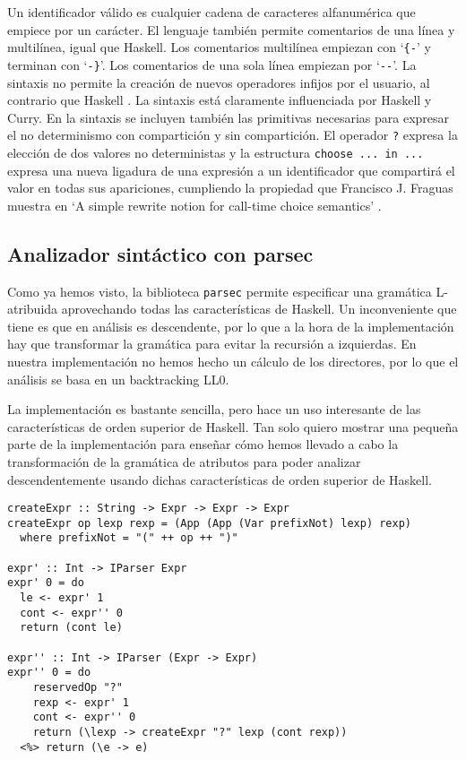 \documentclass[class=article, crop=false]{standalone}
\begin{document}
Un identificador válido es cualquier cadena de caracteres alfanumérica que empiece por un
carácter. El lenguaje también permite comentarios de una línea y multilínea, igual que
Haskell. Los comentarios multilínea empiezan con `\verb`{-`' y terminan con `\verb`-}`'. Los
comentarios de una sola línea empiezan por `\verb`--`'. La sintaxis no permite la creación de
nuevos operadores infijos por el usuario, al contrario que Haskell \cite{marlow2010haskell}.
La sintaxis está claramente influenciada por Haskell y Curry. En la sintaxis se incluyen
también las primitivas necesarias para expresar el no determinismo con compartición y sin
compartición. El operador \verb`?` expresa la elección de dos valores no deterministas y la
estructura \verb`choose ... in ...` expresa una nueva ligadura de una expresión a un
identificador que compartirá el valor en todas sus apariciones, cumpliendo la propiedad que
Francisco J. Fraguas muestra en `A simple rewrite notion for call-time choice semantics'
\cite{lopez2007simple}.

\subsection{Analizador sintáctico con parsec}\label{sec:analizador_sintactico}

Como ya hemos visto, la biblioteca \verb`parsec` permite especificar una gramática
L-atribuida aprovechando todas las características de Haskell. Un inconveniente que tiene es
que en análisis es descendente, por lo que a la hora de la implementación hay que transformar
la gramática para evitar la recursión a izquierdas. En nuestra implementación no hemos hecho
un cálculo de los directores, por lo que el análisis se basa en un backtracking LL0.

La implementación es bastante sencilla, pero hace un uso interesante de las características
de orden superior de Haskell. Tan solo quiero mostrar una pequeña parte de la
implementación para enseñar cómo hemos llevado a cabo la transformación de la gramática de
atributos para poder analizar descendentemente usando dichas características de orden
superior de Haskell.

\begin{verbatim}
createExpr :: String -> Expr -> Expr -> Expr
createExpr op lexp rexp = (App (App (Var prefixNot) lexp) rexp)
  where prefixNot = "(" ++ op ++ ")"

expr' :: Int -> IParser Expr
expr' 0 = do
  le <- expr' 1
  cont <- expr'' 0
  return (cont le)

expr'' :: Int -> IParser (Expr -> Expr)
expr'' 0 = do
    reservedOp "?"
    rexp <- expr' 1
    cont <- expr'' 0
    return (\lexp -> createExpr "?" lexp (cont rexp))
  <%> return (\e -> e)
\end{verbatim}
\end{document}
